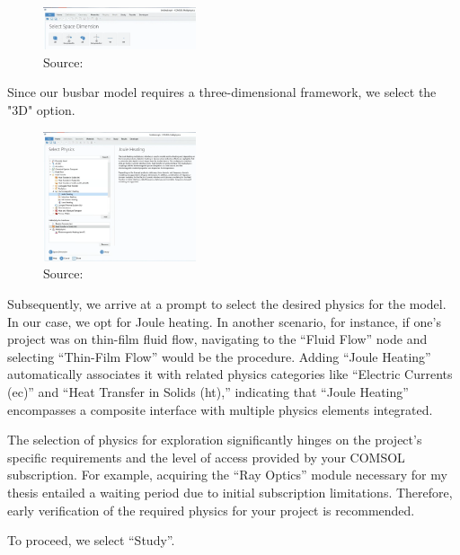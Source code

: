 \begin{figure}[ht!]
  \centering
  \includegraphics[width=0.4\textwidth]{Chapters/Figures/Chapter 3 Figures/Select Space Dimension.png}
  \caption{ Source: \cite{}}
  \label{}
\end{figure}

Since our busbar model requires a three-dimensional framework, we select the "3D" option.

\begin{figure}[ht!]
  \centering
  \includegraphics[width=0.4\textwidth]{Chapters/Figures/Chapter 3 Figures/Select Physics.png}
  \caption{ Source: \cite{}}
  \label{}
\end{figure}

Subsequently, we arrive at a prompt to select the desired physics for the model. In our case, we opt for Joule heating. In another scenario, for instance, if one's project was on thin-film fluid flow, navigating to the ``Fluid Flow'' node and selecting ``Thin-Film Flow'' would be the procedure. Adding ``Joule Heating'' automatically associates it with related physics categories like ``Electric Currents (ec)'' and ``Heat Transfer in Solids (ht),'' indicating that ``Joule Heating'' encompasses a composite interface with multiple physics elements integrated.

The selection of physics for exploration significantly hinges on the project's specific requirements and the level of access provided by your COMSOL subscription. For example, acquiring the ``Ray Optics'' module necessary for my thesis entailed a waiting period due to initial subscription limitations. Therefore, early verification of the required physics for your project is recommended.

To proceed, we select ``Study''.


